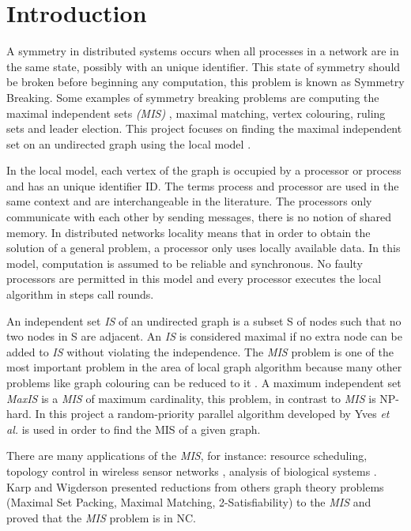 \section{Introduction}
\label{cap:1}

A symmetry in distributed systems occurs when all processes in a network are in the same state, possibly with an unique identifier. This state of symmetry should be broken before beginning any computation, this problem is known as Symmetry Breaking. Some examples of symmetry breaking problems are computing the maximal independent sets \textit{(MIS)} , maximal matching, vertex colouring, ruling sets and leader election. This project focuses on finding the maximal independent set on an undirected graph using the local model \cite{linial1992locality}.

In the local model, each vertex of the graph is occupied by a processor or process and has an unique identifier ID. The terms process and processor are used in the same context and are interchangeable in the literature. The processors only communicate with each other by sending messages, there is no notion of shared memory. In distributed networks locality means that in order to obtain the solution of a general problem, a processor only uses locally available data. In this model, computation is assumed to be reliable and synchronous. No faulty processors are permitted in this model and every processor executes the local algorithm in steps call rounds.  

An independent set \textit{IS} of an undirected graph is a subset S of nodes such that no two nodes in S are adjacent. An \textit{IS} is considered maximal if no extra node can be added to \textit{IS} without violating the independence. The \textit{MIS} problem is one of the most important problem in the area of local graph algorithm because many other problems like graph colouring can be reduced to it \cite{panconesi1992improved}. A maximum independent set \textit{MaxIS} is a \textit{MIS} of maximum cardinality, this problem, in contrast to \textit{MIS} is NP-hard. In this project a random-priority parallel algorithm developed by Yves \textit{et al.} \cite{yves2009optimal} is used in order to find the MIS of a given graph.


There are many applications of the \textit{MIS}, for instance: resource scheduling, topology control in wireless sensor networks \cite{basagni2001finding}, analysis of biological systems \cite{afek2013beeping}. Karp and Wigderson \cite{karp1986constructing} presented reductions from \newline others graph theory problems (Maximal Set Packing, Maximal Matching, 2-Satisfiability) to the \textit{MIS} and proved that the \textit{MIS} problem is in NC.


